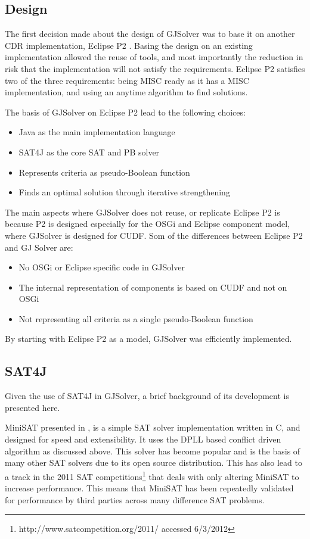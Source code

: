 \subsection{Design}
The first decision made about the design of GJSolver was to base it on another CDR implementation, Eclipse P2 \citep{le_berre_dependency_2009,leBerre2010}.
Basing the design on an existing implementation allowed the reuse of tools, and most importantly the reduction in risk that the implementation will not satisfy the requirements.
Eclipse P2 satisfies two of the three requirements: being MISC ready as it has a MISC implementation, and using an anytime algorithm to find solutions. 

The basis of GJSolver on Eclipse P2 lead to the following choices:
\begin{itemize}
  \item Java as the main implementation language
  \item SAT4J as the core SAT and PB solver
  \item Represents criteria as pseudo-Boolean function
  \item Finds an optimal solution through iterative strengthening
\end{itemize}

The main aspects where GJSolver does not reuse, or replicate Eclipse P2 is because P2 is designed especially for the OSGi and Eclipse component model, where GJSolver is designed for CUDF.
Som of the differences between Eclipse P2 and GJ Solver are:
\begin{itemize}
  \item No OSGi or Eclipse specific code in GJSolver
  \item The internal representation of components is based on CUDF and not on OSGi
  \item Not representing all criteria as a single pseudo-Boolean function
\end{itemize}

By starting with Eclipse P2 as a model, GJSolver was efficiently implemented.

\subsection{SAT4J}
Given the use of SAT4J in GJSolver, a brief background of its development is presented here.

MiniSAT presented in \citep{een2003}, is a simple SAT solver implementation written in C, and designed for speed and extensibility.
It uses the DPLL based conflict driven algorithm as discussed above.
This solver has become popular and is the basis of many other SAT solvers due to its open source distribution.
This has also lead to a track in the 2011 SAT competitions\footnote{http://www.satcompetition.org/2011/ accessed 6/3/2012} that deals with only altering MiniSAT to increase performance.
This means that MiniSAT has been repeatedly validated for performance by third parties across many difference SAT problems. 

